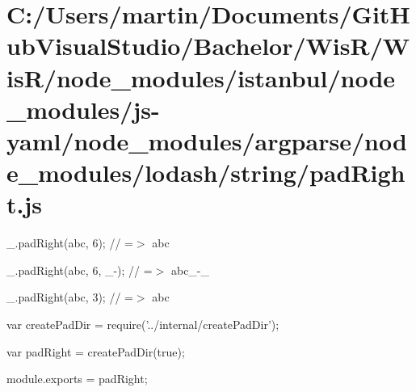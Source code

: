\hypertarget{_c_1_2_users_2martin_2_documents_2_git_hub_visual_studio_2_bachelor_2_wis_r_2_wis_r_2node_module2801323cf7cf90a13ce107e52baf34ad}{}\section{C\+:/\+Users/martin/\+Documents/\+Git\+Hub\+Visual\+Studio/\+Bachelor/\+Wis\+R/\+Wis\+R/node\+\_\+modules/istanbul/node\+\_\+modules/js-\/yaml/node\+\_\+modules/argparse/node\+\_\+modules/lodash/string/pad\+Right.\+js}
\+\_\+.\+pad\+Right(\textquotesingle{}abc\textquotesingle{}, 6); // =$>$ \textquotesingle{}abc \textquotesingle{}

\+\_\+.\+pad\+Right(\textquotesingle{}abc\textquotesingle{}, 6, \textquotesingle{}\+\_\+-\/\textquotesingle{}); // =$>$ \textquotesingle{}abc\+\_\+-\/\+\_\+\textquotesingle{}

\+\_\+.\+pad\+Right(\textquotesingle{}abc\textquotesingle{}, 3); // =$>$ \textquotesingle{}abc\textquotesingle{}


\begin{DoxyCodeInclude}
var createPadDir = require(\textcolor{stringliteral}{'../internal/createPadDir'});

var padRight = createPadDir(\textcolor{keyword}{true});

module.exports = padRight;
\end{DoxyCodeInclude}
 